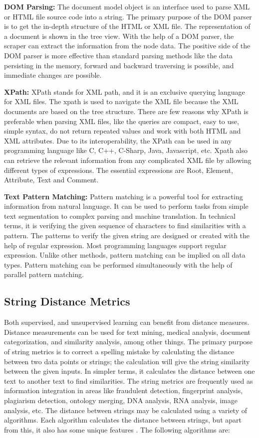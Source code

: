 \textbf{ DOM Parsing:} The document model object is an interface used to parse XML or HTML file source code into a string. The primary purpose of the DOM parser is to get the in-depth structure of the HTML or XML file. The representation of a document is shown in the tree view. With the help of a DOM parser, the scraper can extract the information from the node data. The positive side of the DOM parser is more effective than standard parsing methods like the data persisting in the memory, forward and backward traversing is possible, and immediate changes are possible.

\textbf{ XPath:} XPath stands for XML path, and it is an exclusive querying language for XML files. The xpath is used to navigate the XML file because the XML documents are based on the tree structure. There are few reasons why XPath is preferable when parsing XML files, like the queries are compact, easy to use, simple syntax, do not return repeated values and work with both HTML and XML attributes. Due to its interoperability, the XPath can be used in any programming language like C, C++, C-Sharp, Java, Javascript, etc. Xpath also can retrieve the relevant information from any complicated XML file by allowing different types of expressions. The essential expressions are Root, Element, Attribute, Text and Comment.

\textbf{ Text Pattern Matching:} Pattern matching is a powerful tool for extracting information from natural language. It can be used to perform tasks from simple text segmentation to complex parsing and machine translation. In technical terms, it is verifying the given sequence of characters to find similarities with a pattern. The patterns to verify the given string are designed or created with the help of regular expression. Most programming languages support regular expression. Unlike other methods, pattern matching can be implied on all data types. Pattern matching can be performed simultaneously with the help of parallel pattern matching. 

\subsection{String Distance Metrics}
Both supervised, and unsupervised learning can benefit from distance measures. Distance measurements can be used for text mining, medical analysis, document categorization, and similarity analysis, among other things. The primary purpose of string metrics is to correct a spelling mistake by calculating the distance between two data points or strings; the calculation will give the string similarity between the given inputs. In simpler terms, it calculates the distance between one text to another text to find similarities. The string metrics are frequently used as information integration in areas like fraudulent detection, fingerprint analysis, plagiarism detection, ontology merging, DNA analysis, RNA analysis, image analysis, etc. The distance between strings may be calculated using a variety of algorithms. Each algorithm calculates the distance between strings, but apart from this, it also has some unique features \cite{Wu2020}. The following algorithms are:
